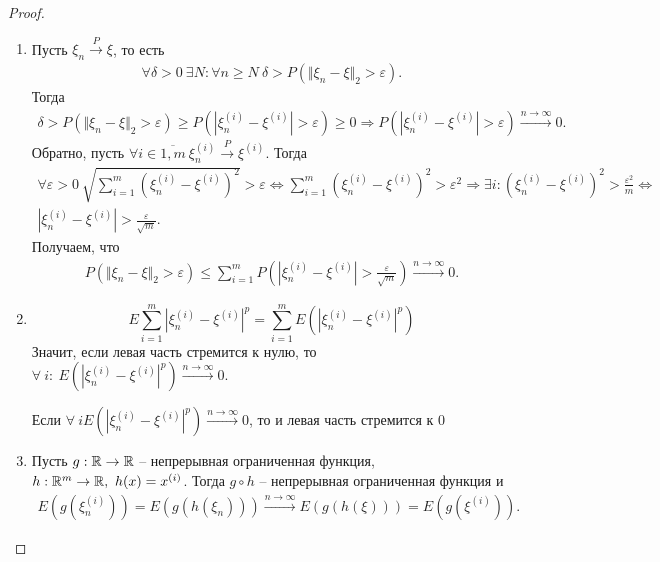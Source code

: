 \begin{proof}
\begin{enumerate}
		\item Пусть $\xi _{n}\xrightarrow{P} \xi$, то есть
		\begin{gather*}
		    \displaystyle \forall \delta  >0\ \exists N:\forall n\geqslant N\ \delta  >P(\Vert \xi _{n} -\xi \Vert _{2}  >\varepsilon ).
		\end{gather*}
		Тогда
		\begin{gather*}
		    \delta  >P(\Vert \xi _{n} -\xi \Vert _{2}  >\varepsilon ) \geqslant P\left(\left| \xi _{n}^{( i)} -\xi ^{( i)}\right|  >\varepsilon \right) \geqslant 0\Rightarrow P\left(\left| \xi _{n}^{( i)} -\xi ^{( i)}\right|  >\varepsilon \right)\xrightarrow{n\rightarrow \infty } 0.
		\end{gather*}
		Обратно, пусть $\forall i\in \overline{1,m} \ \xi _{n}^{( i)}\xrightarrow{P} \xi ^{( i)}$. Тогда
		\begin{gather*}
		    \forall \varepsilon  >0\ \sqrt{\sum _{i=1}^{m}\left( \xi _{n}^{( i)} -\xi ^{( i)}\right)^{2}}  >\varepsilon \Leftrightarrow \sum _{i=1}^{m}\left( \xi _{n}^{( i)} -\xi ^{( i)}\right)^{2}  >\varepsilon ^{2} \Rightarrow \exists i:\left( \xi _{n}^{( i)} -\xi ^{( i)}\right)^{2}  >\frac{\varepsilon ^{2}}{m} \Leftrightarrow\\ \left| \xi _{n}^{( i)} -\xi ^{( i)}\right|  >\frac{\varepsilon }{\sqrt{m}}.
		\end{gather*}
		Получаем, что
		\begin{gather*}
		    P\left(\Vert \xi_n - \xi \Vert_2 > \varepsilon\right) \le \sum_{i=1}^m P\left(\left|\xi_n^{(i)} - \xi^{(i)}\right| > \frac{\varepsilon}{\sqrt{m}}\right) \xrightarrow{n\rightarrow\infty} 0.
		\end{gather*}
		\item
  $$E\sum_{i=1}^{m}\left|\xi_n^{(i)}- \xi^{(i)}\right|^p
 = \sum_{i=1}^{m}E\left(\left|\xi_n^{(i)}- \xi^{(i)}\right|^p\right) $$
 Значит, если левая часть стремится к нулю, то $\forall \ i: \ E\left(\left|\xi_n^{(i)}- \xi^{(i)}\right|^p\right) \xrightarrow{n\rightarrow\infty} 0$.

 Если  $\forall \ i E\left(\left|\xi_n^{(i)}- \xi^{(i)}\right|^p\right) \xrightarrow{n\rightarrow\infty} 0$, то и левая часть стремится к 0
		
		\item Пусть $g:\mathbb{R}\rightarrow\mathbb{R}$ -- непрерывная ограниченная функция, $h:\mathbb{R}^m \rightarrow \mathbb{R},\ h(x) = x^{(i)}$. Тогда $g \circ h$ -- непрерывная ограниченная функция и
		\begin{gather*}
		    E\left(g\left(\xi_n^{(i)}\right)\right) = E\left(g\left(h\left(\xi_n\right)\right)\right) \xrightarrow{n \rightarrow \infty} E\left(g\left(h\left(\xi\right)\right)\right) = E\left(g\left(\xi^{(i)}\right)\right).
		\end{gather*}
	\end{enumerate}

\end{proof}
